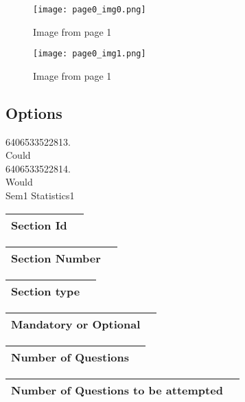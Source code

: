 \documentclass{article}
\begin{document}
\begin{figure}[h]
\centering
\texttt{[image: page0\_img0.png]}
\caption{Image from page 1}
\end{figure}

\begin{figure}[h]
\centering
\texttt{[image: page0\_img1.png]}
\caption{Image from page 1}
\end{figure}

\subsection{Options }

6406533522813.\\

Could\\

6406533522814.\\

Would\\

Sem1 Statistics1\\

\begin{longtable}{|c|c|}
\hline
\textbf{Section Id} & \textbf{} \\ \hline
\end{longtable}

\begin{longtable}{|c|c|}
\hline
\textbf{Section Number} & \textbf{} \\ \hline
\end{longtable}

\begin{longtable}{|c|c|}
\hline
\textbf{Section type} & \textbf{} \\ \hline
\end{longtable}

\begin{longtable}{|c|c|}
\hline
\textbf{Mandatory or Optional} & \textbf{} \\ \hline
\end{longtable}

\begin{longtable}{|c|c|}
\hline
\textbf{Number of Questions} & \textbf{} \\ \hline
\end{longtable}

\begin{longtable}{|c|c|}
\hline
\textbf{Number of Questions to be attempted} & \textbf{} \\ \hline
\end{longtable}
\end{document}
